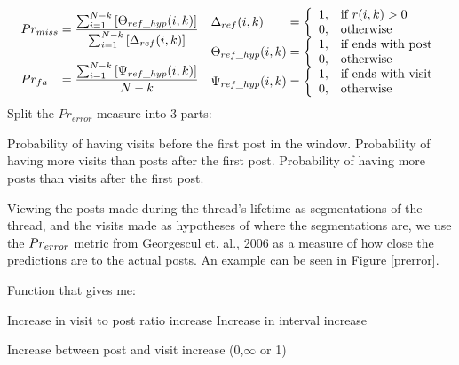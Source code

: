 \documentclass[12 pt]{article}
\begin{document}
\begin{align*}
	\begin{array}{l@{\mskip\thickmuskip}l}
	Pr_{miss} &=  \dfrac{%
		\sum^{N-k}_{i=1} \left[\Theta_{ref\_hyp} (i,k)\right]%
	}{%
		\sum^{N-k}_{i=1} \left[\Delta_{ref} (i,k)\right]%
	}\\
	 & \\
	Pr_{fa} &= \dfrac{%
		\sum^{N-k}_{i=1} \left[\Psi_{ref\_hyp} (i,k)\right]%
	}{N-k}
	\end{array}
	\begin{array}{l@{\mskip\thickmuskip}l}
		\Delta_{ref}(i,k) &= \left\{ \begin{array}{l l}
				1, & \text{if }r(i,k) > 0 \\
				0, & \text{otherwise} 
		\end{array} \right.\\
		\Theta_{ref\_hyp}(i,k) &= \left\{ \begin{array}{l l}
				1, & \text{if ends with post} \\
				0, & \text{otherwise} 
		\end{array} \right.\\
		\Psi_{ref\_hyp}(i,k) &= \left\{ \begin{array}{l l}
				1, & \text{if ends with visit}\\
				0, & \text{otherwise} 
		\end{array} \right.\\
	\end{array}
\end{align*}
Split the $Pr_{error}$ measure into 3 parts:

Probability of having visits before the first post in the window.
Probability of having more visits than posts after the first post.
Probability of having more posts than visits after the first post.



Viewing the posts made during the thread's lifetime as segmentations of the thread, and the visits made as hypotheses of where the segmentations are, we use the $Pr_{error}$ metric from Georgescul et. al., 2006 as a measure of how close the predictions are to the actual posts. An example can be seen in Figure \ref{prerror}.



Function that gives me:

Increase in visit to post ratio		increase
Increase in interval				increase

Increase between post and visit		increase
(0,$\infty$ or 1)
\end{document}
